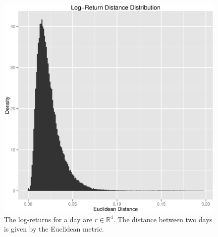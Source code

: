 \documentclass{article}
\begin{document}
\begin{figure}
\begin{center}
\includegraphics[width = 3.5 in, height = 3.5 in]{globplots/lr-dist}
\caption{The log-returns for a  day are $r \in \mathbb{R}^4$. The distance between two days is given by the Euclidean metric.}
\label{lrdist}
\end{center}
\end{figure}
\end{document}
